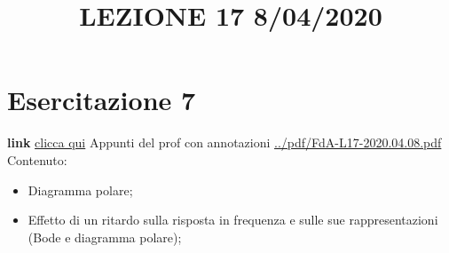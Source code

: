 \section{Esercitazione 7}
\title{LEZIONE 17 8/04/2020}\newline
\textbf{link} \href{https://web.microsoftstream.com/video/5d3f8bd1-ee8b-420b-802f-14dfed0bd278?list=user&userId=faa91214-a6f5-40d7-8875-253fd49b8ce1}{clicca qui}\newline
\newline
Appunti del prof con annotazioni \url{../pdf/FdA-L17-2020.04.08.pdf}\newline
Contenuto:
\begin{itemize}
    \item Diagramma polare;
    \item Effetto di un ritardo sulla risposta in frequenza e sulle sue rappresentazioni (Bode e diagramma polare);
\end{itemize}
